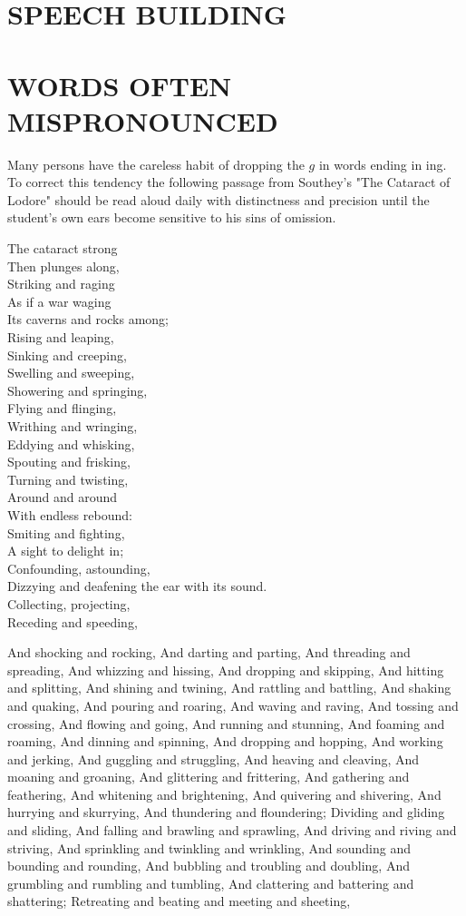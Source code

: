 \documentclass[10pt]{article}
\begin{document}
\section*{SPEECH BUILDING}
\section*{WORDS OFTEN MISPRONOUNCED}
Many persons have the careless habit of dropping the $g$ in words ending in ing. To correct this tendency the following passage from Southey's "The Cataract of Lodore" should be read aloud daily with distinctness and precision until the student's own ears become sensitive to his sins of omission.

The cataract strong\\
Then plunges along,\\
Striking and raging\\
As if a war waging\\
Its caverns and rocks among;\\
Rising and leaping,\\
Sinking and creeping,\\
Swelling and sweeping,\\
Showering and springing,\\
Flying and flinging,\\
Writhing and wringing,\\
Eddying and whisking,\\
Spouting and frisking,\\
Turning and twisting,\\
Around and around\\
With endless rebound:\\
Smiting and fighting,\\
A sight to delight in;\\
Confounding, astounding,\\
Dizzying and deafening the ear with its sound.\\
Collecting, projecting,\\
Receding and speeding,

And shocking and rocking, And darting and parting, And threading and spreading, And whizzing and hissing, And dropping and skipping, And hitting and splitting, And shining and twining, And rattling and battling, And shaking and quaking, And pouring and roaring, And waving and raving, And tossing and crossing, And flowing and going, And running and stunning, And foaming and roaming, And dinning and spinning, And dropping and hopping, And working and jerking, And guggling and struggling, And heaving and cleaving, And moaning and groaning, And glittering and frittering, And gathering and feathering, And whitening and brightening, And quivering and shivering, And hurrying and skurrying, And thundering and floundering; Dividing and gliding and sliding, And falling and brawling and sprawling, And driving and riving and striving, And sprinkling and twinkling and wrinkling, And sounding and bounding and rounding, And bubbling and troubling and doubling, And grumbling and rumbling and tumbling, And clattering and battering and shattering; Retreating and beating and meeting and sheeting,
\end{document}
